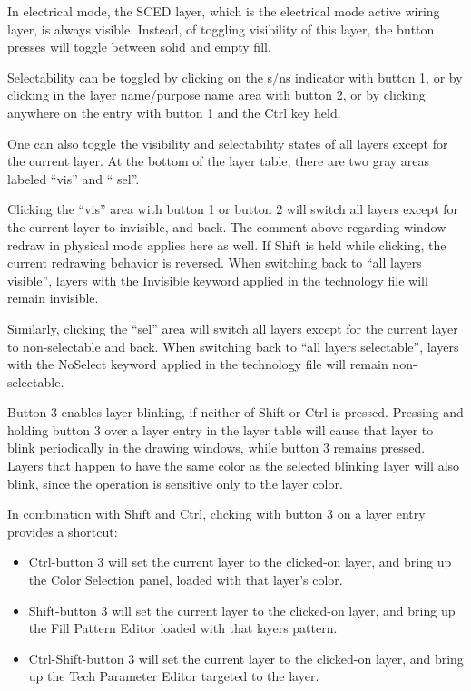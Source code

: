 In electrical mode, the SCED layer, which is the electrical mode
active wiring layer, is always visible.  Instead, of toggling
visibility of this layer, the button presses will toggle between solid
and empty fill.

Selectability can be toggled by clicking on the {\vt s}/{\vt ns}
indicator with button 1, or by clicking in the layer name/purpose name
area with button 2, or by clicking anywhere on the entry with button 1
and the {\kb Ctrl} key held.

One can also toggle the visibility and selectability states of all
layers except for the current layer.  At the bottom of the layer
table, there are two gray areas labeled ``{\vt vis}'' and ``{\vt
sel}''.

Clicking the ``{\vt vis}'' area with button 1 or button 2 will switch
all layers except for the current layer to invisible, and back.  The
comment above regarding window redraw in physical mode applies here as
well.  If {\kb Shift} is held while clicking, the current redrawing
behavior is reversed.  When switching back to ``all layers visible'',
layers with the {\vt Invisible} keyword applied in the technology file
will remain invisible.

Similarly, clicking the ``{\vt sel}'' area will switch all layers
except for the current layer to non-selectable and back.  When
switching back to ``all layers selectable'', layers with the {\vt
NoSelect} keyword applied in the technology file will remain
non-selectable.

Button 3 enables layer blinking, if neither of {\kb Shift} or {\cb
Ctrl} is pressed.  Pressing and holding button 3 over a layer entry in
the layer table will cause that layer to blink periodically in the
drawing windows, while button 3 remains pressed.  Layers that happen
to have the same color as the selected blinking layer will also blink,
since the operation is sensitive only to the layer color.

In combination with {\kb Shift} and {\kb Ctrl}, clicking with button 3
on a layer entry provides a shortcut:

\begin{itemize}
\item{{\kb Ctrl}-button 3 will set the current layer to the clicked-on
layer, and bring up the {\cb Color Selection} panel, loaded with that
layer's color.}

\item{{\kb Shift}-button 3 will set the current layer to the
clicked-on layer, and bring up the {\cb Fill Pattern Editor} loaded
with that layers pattern.}

\item{{\kb Ctrl-Shift}-button 3 will set the current layer to the
clicked-on layer, and bring up the {\cb Tech Parameter Editor}
targeted to the layer.}
\end{itemize}

